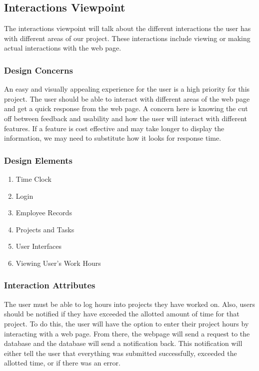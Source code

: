 \documentclass[letterpaper,10pt,titlepage,journal,compsoc,draftclsnofoot,onecolumn]{IEEEtran}
\newcommand\tab[1][1cm]{\hspace*{#1}}
\begin{document}
\subsection{Interactions Viewpoint}

\tab The interactions viewpoint will talk about the different interactions the user has with different areas of our project. These interactions include viewing or making actual interactions with the web page.

\subsubsection{Design Concerns}

\tab An easy and visually appealing experience for the user is a high priority for this project. The user should be able to interact with different areas of the web page and get a quick response from the web page. A concern here is knowing the cut off between feedback and usability and how the user will interact with different features. If a feature is cost effective and may take longer to display the information, we may need to substitute how it looks for response time.

\subsubsection{Design Elements}

\begin{enumerate}

\item{Time Clock}
\item{Login}
\item{Employee Records}
\item{Projects and Tasks}
\item{User Interfaces}
\item{Viewing User's Work Hours}

\end{enumerate}

\subsubsection{Interaction Attributes}

\tab The user must be able to log hours into projects they have worked on. Also, users should be notified if they have exceeded the allotted amount of time for that project. To do this, the user will have the option to enter their project hours by interacting with a web page. From there, the webpage will send a request to the database and the database will send a notification back. This notification will either tell the user that everything was submitted successfully, exceeded the allotted time, or if there was an error.\newline
\end{document}
